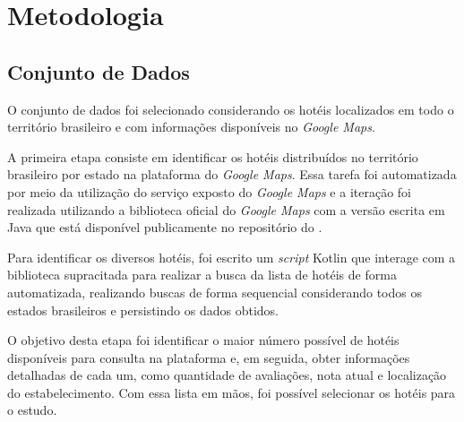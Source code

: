 \chapter{Metodologia}
\label{cap:metodologia}


\section{Conjunto de Dados}
\label{cap:metodologia:sec:conjunto_dados}


O conjunto de dados foi selecionado considerando os hotéis localizados em todo o território brasileiro e com informações disponíveis no \textit{Google Maps}.

A primeira etapa consiste em identificar os hotéis distribuídos no território brasileiro por estado na plataforma do \textit{Google Maps}. Essa tarefa foi automatizada por meio da utilização do serviço exposto do \textit{Google Maps} e a iteração foi realizada utilizando a biblioteca oficial do \textit{Google Maps} com a versão escrita em Java que está disponível publicamente no repositório do .

Para identificar os diversos hotéis, foi escrito um \emph{script} Kotlin \cite{scriptKotlinBuscarHoteis} que interage com a biblioteca supracitada para realizar a busca da lista de hotéis de forma automatizada, realizando buscas de forma sequencial considerando todos os estados brasileiros e persistindo os dados obtidos.

O objetivo desta etapa foi identificar o maior número possível de hotéis disponíveis para consulta na plataforma e, em seguida, obter informações detalhadas de cada um, como quantidade de avaliações, nota atual e localização do estabelecimento. Com essa lista em mãos, foi possível selecionar os hotéis para o estudo.

